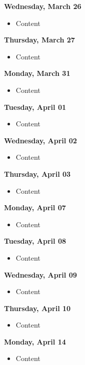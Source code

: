 \documentclass{article}
\begin{document}
\textbf{Wednesday, March 26}

\begin{itemize}
\item Content
\end{itemize}

\textbf{Thursday, March 27}

\begin{itemize}
\item Content
\end{itemize}

\textbf{Monday, March 31}

\begin{itemize}
\item Content
\end{itemize}

\textbf{Tuesday, April 01}

\begin{itemize}
\item Content
\end{itemize}

\textbf{Wednesday, April 02}

\begin{itemize}
\item Content
\end{itemize}

\textbf{Thursday, April 03}

\begin{itemize}
\item Content
\end{itemize}

\textbf{Monday, April 07}

\begin{itemize}
\item Content
\end{itemize}

\textbf{Tuesday, April 08}

\begin{itemize}
\item Content
\end{itemize}

\textbf{Wednesday, April 09}

\begin{itemize}
\item Content
\end{itemize}

\textbf{Thursday, April 10}

\begin{itemize}
\item Content
\end{itemize}

\textbf{Monday, April 14}

\begin{itemize}
\item Content
\end{itemize}
\end{document}
